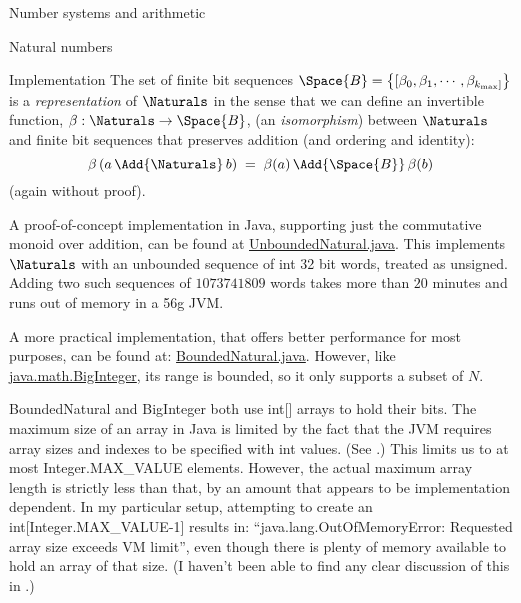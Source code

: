 \documentclass[12pt]{PalisadesLakesBook}
\begin{document}
\begin{plSection}{Number systems and arithmetic}
\begin{plSection}{Natural numbers}
\begin{plSection}{Implementation}
The set of finite bit sequences 
$\Space{B} = \left\{[\beta_{0}, \beta_{1}, \cdots, 
\beta_{k_{\text{max}}]} \right\}$
 is a 
\emph{representation} of $\Naturals$
in the sense that we can define an invertible function,
$\beta : \Naturals \rightarrow \Space{B}$,
(an \emph{isomorphism}) between $\Naturals$ and 
finite bit sequences
that preserves addition (and ordering and identity):
\begin{equation}
\beta \left( a \,\Add{\Naturals} \, b\right)
\;=\;
\beta ( a ) \, \Add{\Space{B}} \, \beta ( b )
\end{equation}
(again without proof).

A proof-of-concept implementation in Java,
supporting just the commutative monoid over addition, 
can be found at
\href{https://github.com/palisades-lakes/sicpplus/blob/main/src/main/java/sicpplus/java/numbers/UnboundedNatural.java}
{\javaFont UnboundedNatural.java}.
This implements $\Naturals$ with an unbounded sequence
of {\javaFont int} 32 bit words, treated as unsigned.
Adding two such sequences of $1073741809$ words
takes more than $20$ minutes and 
runs out of memory in a 56g JVM.

A more practical implementation,
that offers better performance for most purposes,
can be found at: 
\href{https://github.com/palisades-lakes/sicpplus/blob/main/src/main/java/sicpplus/java/numbers/BoundedNatural.java}
{\javaFont BoundedNatural.java}.
However, 
like \href{https://github.com/openjdk/jdk/blob/master/src/java.base/share/classes/java/math/BigInteger.java}
{\javaFont java.math.BigInteger},
its range is bounded, so it only supports a subset of $N$.

{\javaFont BoundedNatural} and {\javaFont BigInteger}
both use {\javaFont int[]} arrays to hold their bits.
The maximum size of an array in Java is limited
by the fact that the JVM 
requires array sizes and indexes to be specified 
with {\javaFont int} values.
(See .)
This limits us to at most {\javaFont Integer.MAX\_VALUE} elements.
However, the actual maximum array length is strictly less than that,
by an amount that appears to be implementation dependent.
In my particular setup, attempting to create an 
{\javaFont int[Integer.MAX\_VALUE-1]} results in:
``{\javaFont java.lang.OutOfMemoryError: 
Requested array size exceeds VM limit}'',
even though there is plenty of memory available to hold 
an array of that size.
(I haven't been able to find any clear discussion of this in
.)


\end{plSection}
\end{plSection}
\end{plSection}
\end{document}
